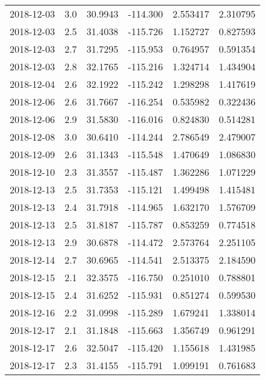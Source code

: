 \begin{tabular}{lrrrrr}
2018-12-03 &       3.0 &  30.9943 &  -114.300 &         2.553417 &         2.310795 \\
2018-12-03 &       2.5 &  31.4038 &  -115.726 &         1.152727 &         0.827593 \\
2018-12-03 &       2.7 &  31.7295 &  -115.953 &         0.764957 &         0.591354 \\
2018-12-03 &       2.8 &  32.1765 &  -115.216 &         1.324714 &         1.434904 \\
2018-12-04 &       2.6 &  32.1922 &  -115.242 &         1.298298 &         1.417619 \\
2018-12-06 &       2.6 &  31.7667 &  -116.254 &         0.535982 &         0.322436 \\
2018-12-06 &       2.9 &  31.5830 &  -116.016 &         0.824830 &         0.514281 \\
2018-12-08 &       3.0 &  30.6410 &  -114.244 &         2.786549 &         2.479007 \\
2018-12-09 &       2.6 &  31.1343 &  -115.548 &         1.470649 &         1.086830 \\
2018-12-10 &       2.3 &  31.3557 &  -115.487 &         1.362286 &         1.071229 \\
2018-12-13 &       2.5 &  31.7353 &  -115.121 &         1.499498 &         1.415481 \\
2018-12-13 &       2.4 &  31.7918 &  -114.965 &         1.632170 &         1.576709 \\
2018-12-13 &       2.5 &  31.8187 &  -115.787 &         0.853259 &         0.774518 \\
2018-12-13 &       2.9 &  30.6878 &  -114.472 &         2.573764 &         2.251105 \\
2018-12-14 &       2.7 &  30.6965 &  -114.541 &         2.513375 &         2.184590 \\
2018-12-15 &       2.1 &  32.3575 &  -116.750 &         0.251010 &         0.788801 \\
2018-12-15 &       2.4 &  31.6252 &  -115.931 &         0.851274 &         0.599530 \\
2018-12-16 &       2.2 &  31.0998 &  -115.289 &         1.679241 &         1.338014 \\
2018-12-17 &       2.1 &  31.1848 &  -115.663 &         1.356749 &         0.961291 \\
2018-12-17 &       2.6 &  32.5047 &  -115.420 &         1.155618 &         1.431985 \\
2018-12-17 &       2.3 &  31.4155 &  -115.791 &         1.099191 &         0.761683 \\

\end{tabular}
